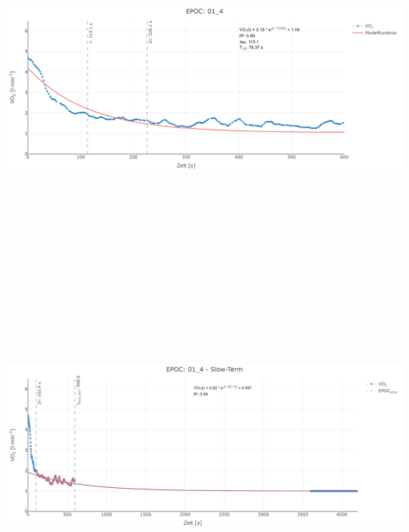 \documentclass[
  letterpaper,
  DIV=11]{scrartcl}
\begin{document}
\includegraphics[width=11.45833in,height=4.6875in]{images/01_4_tau.png}
\includegraphics[width=11.45833in,height=4.6875in]{images/01_4_slow.png}
\end{document}

